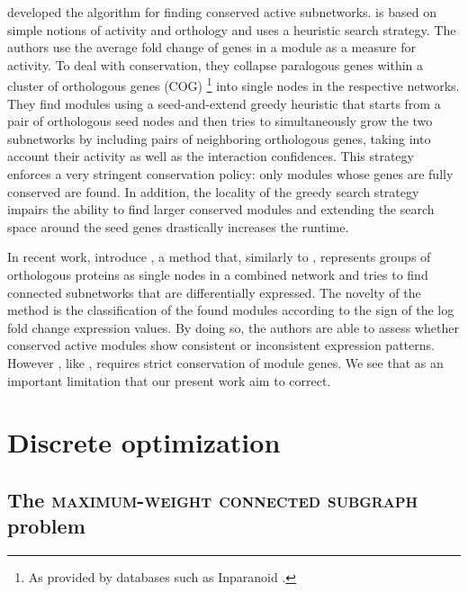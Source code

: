 		\Textcite{deshpande2010scalable} developed the \nexus{} algorithm for finding conserved active subnetworks.
		\nexus{} is based on simple notions of activity and orthology and uses a heuristic search strategy.
		The authors use the average fold change of genes in a module as a measure for activity.
		To deal with conservation, they collapse paralogous genes within a cluster of orthologous genes (COG) \parencite{tatusov1997genomic}\footnote{As provided by databases such as Inparanoid \parencite{obrien2005inparanoid}.} into single nodes in the respective networks.
		They find modules using a seed-and-extend greedy heuristic that starts from a pair of orthologous seed nodes and then tries to simultaneously grow the two subnetworks by including pairs of neighboring orthologous genes, taking into account their activity as well as the interaction confidences.
		This strategy enforces a very stringent conservation policy: only modules whose genes are fully conserved are found.
		In addition, the locality of the greedy search strategy impairs the ability to find larger conserved modules and extending the search space around the seed genes drastically increases the runtime.

		In recent work, \textcite{zinman2015moduleblast} introduce \moduleblast{}, a method that, similarly to \nexus{}, represents groups of orthologous proteins as single nodes in a combined network and tries to find connected subnetworks that are differentially expressed.
		The novelty of the method is the classification of the found modules according to the sign of the log fold change expression values.
		By doing so, the authors are able to assess whether conserved active modules show consistent or inconsistent
  expression patterns.
		However \moduleblast{}, like \nexus{}, requires strict conservation of module genes.
		We see that as an important limitation that our present work aim to correct.


\section{Discrete optimization}

\subsection{The \textsc{maximum-weight connected subgraph} problem}
\label{sec:mwcsproblem}


